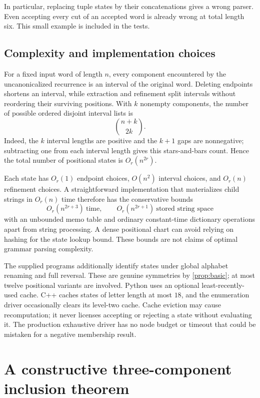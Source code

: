 \documentclass[11pt,letterpaper]{article}
\numberwithin{equation}{section}
\theoremstyle{definition}
\theoremstyle{remark}
\begin{document}
In particular, replacing tuple states by their concatenations gives a
wrong parser. Even accepting every cut of an accepted word is already
wrong at total length six. This small example is included in the tests.

\subsection{Complexity and implementation choices}
For a fixed input word of length \(n\), every component encountered by the
uncanonicalized recurrence is an interval of the original word. Deleting
endpoints shortens an interval, while extraction and refinement split
intervals without reordering their surviving positions. With \(k\)
nonempty components, the number of possible ordered disjoint interval
lists is
\[
 \binom{n+k}{2k}.
\]
Indeed, the \(k\) interval lengths are positive and the \(k+1\) gaps
are nonnegative; subtracting one from each interval length gives this
stars-and-bars count. Hence the total number of positional states is
\(O_r(n^{2r})\).

Each state has \(O_r(1)\) endpoint choices, \(O(n^2)\) interval choices,
and \(O_r(n)\) refinement choices. A straightforward implementation that
materializes child strings in \(O_r(n)\) time therefore has the
conservative bounds
\[
  O_r(n^{2r+3})\ \text{time},\qquad
  O_r(n^{2r+1})\ \text{stored string space}
\]
with an unbounded memo table and ordinary constant-time dictionary
operations apart from string processing. A dense positional chart can
avoid relying on hashing for the state lookup bound. These bounds are
not claims of optimal grammar parsing complexity.

The supplied programs additionally identify states under global alphabet
renaming and full reversal. These are genuine symmetries by
\cref{prop:basic}; at most twelve positional variants are involved.
Python uses an optional least-recently-used cache. C++ caches states of
letter length at most \(18\), and the enumeration driver occasionally
clears its level-two cache. Cache eviction may cause recomputation;
it never licenses accepting or rejecting a state without evaluating it.
The production exhaustive driver has no node budget or timeout that
could be mistaken for a negative membership result.

\section{A constructive three-component inclusion theorem}
\label{sec:positive}
\end{document}
